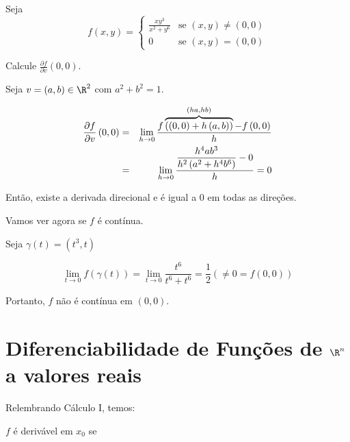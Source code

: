 \documentclass[11pt, oneside, a4paper]{gsm-l}
\begin{document}
\begin{exem}
Seja
\begin{equation*}
f(x,y)=\left\{ \begin{array}{cl}\displaystyle
        \frac{{xy^3}}{{x^2  + y^6 }} & \textrm{se }\left( {x,y} \right) \ne \left( {0,0} \right)\\
        0 & \textrm{se }\left( {x,y} \right) = \left( {0,0} \right)\end{array}\right.
\end{equation*}

Calcule $\frac{{\partial f}}{{\partial v}}\left( {0,0} \right)$.
\end{exem}

\begin{sol}
Seja $v = \left( {a,b} \right) \in \R^2$ com $a^2 + b^2 = 1$.

\begin{eqnarray*}\displaystyle
  \frac{{\partial f}}{{\partial v}}\left( {0,0} \right) &=& \mathop {\lim }\limits_{h \to 0} \frac{{f\overbrace {\left( {\left( {0,0} \right) + h\left( {a,b} \right)} \right)}^{\left( {ha,hb} \right)} - f\left( {0,0} \right)}}{h} \hfill \\
   &=& \mathop {\lim }\limits_{h \to 0} \frac{{\displaystyle  \frac{{h^4 ab^3 }}{{h^2 \left( {a^2  + h^4 b^6 } \right)}} - 0}}
{h} = 0 \hfill \\
\end{eqnarray*}

Então, existe a derivada direcional e é igual a $0$ em todas as direções.

Vamos ver agora se $f$ é contínua.

Seja $\gamma \left( t \right) = \left( {t^3 ,t} \right)$

\[
    \mathop {\lim }\limits_{t \to 0} f\left( {\gamma \left( t \right)} \right) = \mathop {\lim }\limits_{t \to 0} \frac{{t^6 }}{{t^6  + t^6 }} = \frac{1}{2}\left( { \ne 0 = f\left( {0,0} \right)} \right)
\]

Portanto, $f$ não é contínua em $(0,0)$.
\end{sol}

\section{Diferenciabilidade de Funções de $\R^n$ a valores reais} \label{sec14}

Relembrando Cálculo I, temos:

$f$ é derivável em $x_0$ se
\end{document}
